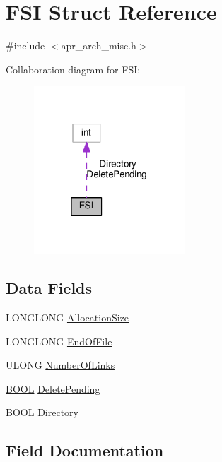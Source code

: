 \hypertarget{structFSI}{}\section{F\+SI Struct Reference}
\label{structFSI}


{\ttfamily \#include $<$apr\+\_\+arch\+\_\+misc.\+h$>$}



Collaboration diagram for F\+SI\+:
\nopagebreak
\begin{figure}[H]
\begin{center}
\leavevmode
\includegraphics[width=160pt]{structFSI__coll__graph}
\end{center}
\end{figure}
\subsection*{Data Fields}
\begin{DoxyCompactItemize}
\item 
L\+O\+N\+G\+L\+O\+NG \hyperlink{structFSI_ad4c33115c6f5c1077bcdc8cb1fb6d599}{Allocation\+Size}
\item 
L\+O\+N\+G\+L\+O\+NG \hyperlink{structFSI_a09bc17bd09b207aac72e050b25823649}{End\+Of\+File}
\item 
U\+L\+O\+NG \hyperlink{structFSI_a421a503e1ec3e89b0ad3e267157b3d2a}{Number\+Of\+Links}
\item 
\hyperlink{pcre__internal_8h_a050c65e107f0c828f856a231f4b4e788}{B\+O\+OL} \hyperlink{structFSI_a7a518162b2055fc67146af410926f619}{Delete\+Pending}
\item 
\hyperlink{pcre__internal_8h_a050c65e107f0c828f856a231f4b4e788}{B\+O\+OL} \hyperlink{structFSI_a0eff3a234660d8b546ace06282e9bdda}{Directory}
\end{DoxyCompactItemize}


\subsection{Field Documentation}
